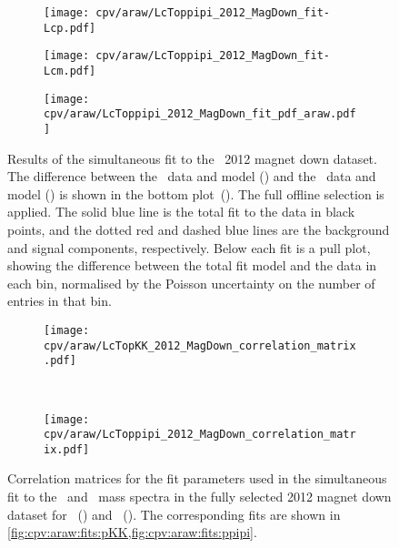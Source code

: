 \begin{figure}
  \begin{subfigure}[b]{0.5\textwidth}
    \texttt{[image: cpv/araw/LcToppipi\_2012\_MagDown\_fit-Lcp.pdf]}
    \caption{\PLambdac}
    \label{fig:cpv:araw:fits:ppipi:Lcp}
  \end{subfigure}
  \begin{subfigure}[b]{0.5\textwidth}
    \texttt{[image: cpv/araw/LcToppipi\_2012\_MagDown\_fit-Lcm.pdf]}
    \caption{\APLambdac}
    \label{fig:cpv:araw:fits:ppipi:Lcm}
  \end{subfigure}
  \begin{subfigure}[b]{0.5\textwidth}
    \texttt{[image: cpv/araw/LcToppipi\_2012\_MagDown\_fit\_pdf\_araw.pdf]}
    \caption{\ARaw}
    \label{fig:cpv:araw:fits:ppipi:ARaw}
  \end{subfigure}
  \caption{%
    Results of the simultaneous fit to the \ppipi\ 2012 magnet down dataset.
    The difference between the \PLambdac\ data and model 
    () and the \APLambdac\ data and model 
    () is shown in the bottom 
    plot~().
    The full offline selection is applied.
    The solid blue line is the total fit to the data in black points, and the 
    dotted red and dashed blue lines are the background and signal components, 
    respectively.
    Below each fit is a pull plot, showing the difference between the total fit 
    model and the data in each bin, normalised by the Poisson uncertainty on 
    the number of entries in that bin.
  }
  \label{fig:cpv:araw:fits:ppipi}
\end{figure}

\begin{figure}
  \begin{center}
    \begin{subfigure}[b]{0.6\textwidth}
      \texttt{[image: cpv/araw/LcTopKK\_2012\_MagDown\_correlation\_matrix.pdf]}
      \caption{\pKK}
      \label{fig:cpv:araw:correlation:pKK}
    \end{subfigure}\\
    \begin{subfigure}[b]{0.6\textwidth}
      \texttt{[image: cpv/araw/LcToppipi\_2012\_MagDown\_correlation\_matrix.pdf]}
      \caption{\ppipi}
      \label{fig:cpv:araw:correlation:ppipi}
    \end{subfigure}
  \end{center}
  \caption{%
    Correlation matrices for the fit parameters used in the simultaneous fit to 
    the \PLambdac\ and \APLambdac\ mass spectra in the fully selected 2012 
    magnet down dataset for \pKK~() and 
    \ppipi~().
    The corresponding fits are shown in 
    \cref{fig:cpv:araw:fits:pKK,fig:cpv:araw:fits:ppipi}.
  }
  \label{fig:cpv:araw:correlation}
\end{figure}

